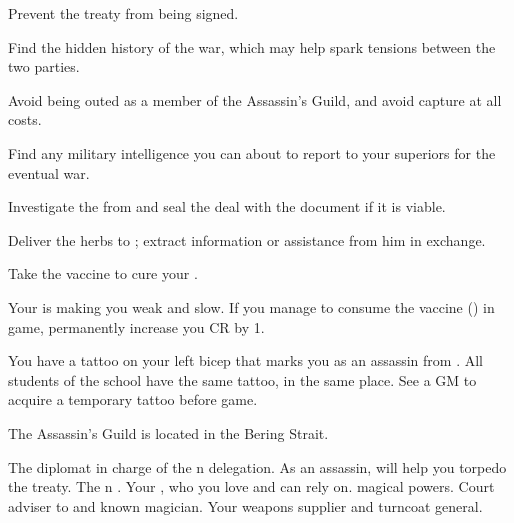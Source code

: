 \documentclass[char]{NeptuneBall}
\begin{document}
\begin{itemz}[Goals]
	\item Prevent the treaty from being signed.
	\item Find the hidden history of the war, which may help spark tensions between the two parties.
	\item Avoid being outed as a member of the Assassin's Guild, and avoid capture at all costs.
  \item Find any military intelligence you can about \pAtlantis{} to report to your superiors for the eventual war.
	\item Investigate the \iPrototype{} from \cGeneral{} and seal the deal with the \iBattlePlan{} document if it is viable.
	\item Deliver the herbs to \cManta{}; extract information or assistance from him in exchange.
	\item Take the vaccine to cure your \pPolio{}.
\end{itemz}

\begin{itemz}[Notes]
  \item Your \pPolio{} is making you weak and slow. If you manage to consume the vaccine (\iVaccine{}) in game, permanently increase you CR by 1.
	\item You have a tattoo on your left bicep that marks you as an assassin from \pAssassin{}. All students of the school have the same tattoo, in the same place. See a GM to acquire a temporary tattoo before game.
\end{itemz}

\begin{itemz}[Trivia]
  \item The Assassin's Guild is located in the Bering Strait.
\end{itemz}

\begin{contacts}
	\contact{\cDiplomat{}} The diplomat in charge of the \pPacifica{}n delegation. As an assassin, \cDiplomat{\they} will help you torpedo the treaty.
	\contact{\cPrince{}} The \pPacifica{}n \cPrince{\Prince}.
  \contact{\cBodyguard{}} Your \cSpy{\sibling}, who you love and can rely on. \cBodyguard{\They} \cBodyguard{\have} magical powers.
	\contact{\cManta{}} Court adviser to \cKing{\King} \cKing{} and known magician.
	\contact{\cGeneral{}} Your weapons supplier and turncoat general.
\end{contacts}
\end{document}
